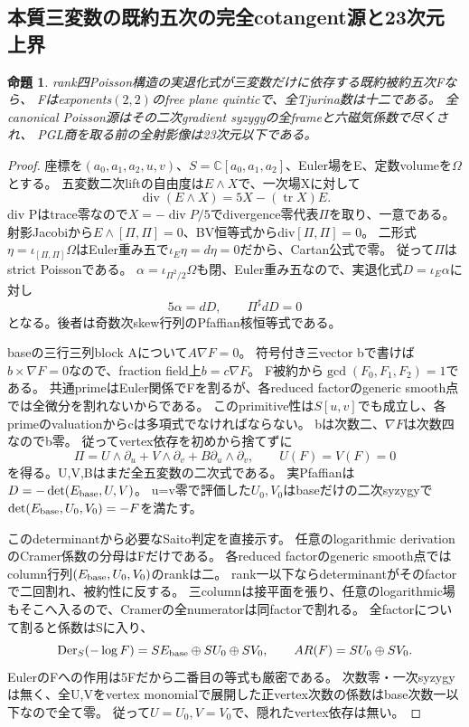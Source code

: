 \documentclass[a4paper,11pt]{ltjsarticle}
\newtheorem{proposition}{命題}[section]
\theoremstyle{definition}
\begin{document}
\subsection{本質三変数の既約五次の完全cotangent源と23次元上界}
\begin{proposition}\label{prop:essential-three-quintic-G}
rank四Poisson構造の実退化式が三変数だけに依存する既約被約五次Fなら、
Fはexponents$(2,2)$のfree plane quinticで、全Tjurina数は十二である。
全canonical Poisson源はその二次gradient syzygyの全frameと六磁気係数で尽くされ、
PGL商を取る前の全射影像は23次元以下である。
\end{proposition}
\begin{proof}
座標を$(a_0,a_1,a_2,u,v)$、$S=\mathbb C[a_0,a_1,a_2]$、Euler場をE、定数volumeを$\Omega$とする。
五変数二次liftの自由度は$E\wedge X$で、一次場Xに対して
\[
 \operatorname{div}(E\wedge X)=5X-(\operatorname{tr}X)E.
\]
div Pはtrace零なので$X=-\operatorname{div}P/5$でdivergence零代表$\Pi$を取り、一意である。
射影Jacobiから$E\wedge[\Pi,\Pi]=0$、BV恒等式からdiv$[\Pi,\Pi]=0$。
二形式$\eta=\iota_{[\Pi,\Pi]}\Omega$はEuler重み五で$\iota_E\eta=d\eta=0$だから、Cartan公式で零。
従って$\Pi$はstrict Poissonである。
$\alpha=\iota_{\Pi^2/2}\Omega$も閉、Euler重み五なので、実退化式$D=\iota_E\alpha$に対し
\[
 5\alpha=dD,\qquad \Pi^\sharp dD=0
\]
となる。後者は奇数次skew行列のPfaffian核恒等式である。

baseの三行三列block Aについて$A\nabla F=0$。
符号付き三vector bで書けば$b\times\nabla F=0$なので、fraction field上$b=c\nabla F$。
F被約から$\gcd(F_0,F_1,F_2)=1$である。
共通primeはEuler関係でFを割るが、各reduced factorのgeneric smooth点では全微分を割れないからである。
このprimitive性は$S[u,v]$でも成立し、各primeのvaluationからcは多項式でなければならない。
bは次数二、$\nabla F$は次数四なのでb零。
従ってvertex依存を初めから捨てずに
\[
 \Pi=U\wedge\partial_u+V\wedge\partial_v+B\partial_u\wedge\partial_v,
 \qquad U(F)=V(F)=0
\]
を得る。U,V,Bはまだ全五変数の二次式である。
実Pfaffianは$D=-\det(E_{\rm base},U,V)$。
u=v零で評価した$U_0,V_0$はbaseだけの二次syzygyで
$\det(E_{\rm base},U_0,V_0)=-F$を満たす。

このdeterminantから必要なSaito判定を直接示す。
任意のlogarithmic derivationのCramer係数の分母はFだけである。
各reduced factorのgeneric smooth点ではcolumn行列$(E_{\rm base},U_0,V_0)$のrankは二。
rank一以下ならdeterminantがそのfactorで二回割れ、被約性に反する。
三columnは接平面を張り、任意のlogarithmic場もそこへ入るので、Cramerの全numeratorは同factorで割れる。
全factorについて割ると係数はSに入り、
\[
 \operatorname{Der}_S(-\log F)=SE_{\rm base}\oplus SU_0\oplus SV_0,
 \qquad AR(F)=SU_0\oplus SV_0.
\]
EulerのFへの作用は5Fだから二番目の等式も厳密である。
次数零・一次syzygyは無く、全U,Vをvertex monomialで展開した正vertex次数の係数はbase次数一以下なので全て零。
従って$U=U_0,V=V_0$で、隠れたvertex依存は無い。


\end{proof}
\end{document}
